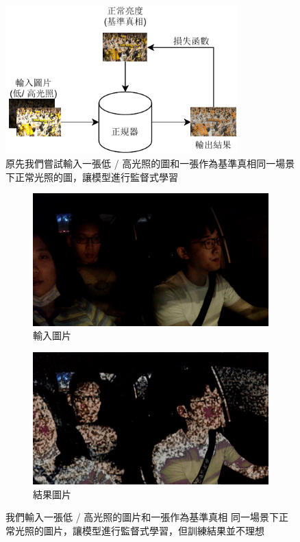 \begin{figure}[htb]
\centering
\includegraphics[width=0.8\textwidth]{figures/original_pretrain}
\caption[預訓練時我們嘗試過的架構]{原先我們嘗試輸入一張低 / 高光照的圖和一張作為基準真相同一場景下正常光照的圖，讓模型進行監督式學習}
\label{fig:original_pretrain}
\end{figure}

\begin{figure}[htb]
\centering
\begin{subfigure}[b]{0.45\textwidth}
    \centering
    \includegraphics[width=\textwidth]{figures/ori_input}
    \caption{輸入圖片}
\end{subfigure}
\begin{subfigure}[b]{0.45\textwidth}
    \centering
    \includegraphics[width=\textwidth]{figures/both_output}
    \caption{結果圖片}
\end{subfigure}
\caption[使用舊訓練架構進行監督式學習後之結果]{我們輸入一張低 / 高光照的圖片和一張作為基準真相 同一場景下正常光照的圖片，讓模型進行監督式學習，但訓練結果並不理想}
\label{fig:train_compare}
\end{figure}

